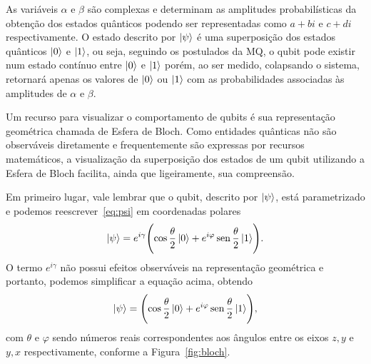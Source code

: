 As variáveis $\alpha$ e $\beta$ são complexas e determinam as amplitudes probabilísticas da obtenção dos estados quânticos podendo ser representadas como $a+bi$ e $c+di$ respectivamente. O estado descrito por $\ket{\psi}$ é uma superposição dos estados quânticos $\ket{0}$ e $\ket{1}$, ou seja, seguindo os postulados da MQ, o qubit pode existir num estado contínuo entre $\ket{0}$ e $\ket{1}$ porém, ao ser medido, colapsando o sistema, retornará apenas os valores de $\ket{0}$ ou $\ket{1}$ com as probabilidades associadas às amplitudes de $\alpha$ e $\beta$.

Um recurso para visualizar o comportamento de qubits é sua representação geométrica chamada de Esfera de Bloch. Como entidades quânticas não são observáveis diretamente e frequentemente são expressas por recursos matemáticos, a visualização da superposição dos estados de um qubit utilizando a Esfera de Bloch facilita, ainda que ligeiramente, sua compreensão.

Em primeiro lugar, vale lembrar que o qubit, descrito por $\ket{\psi}$, está parametrizado e podemos reescrever~\eqref{eq:psi} em coordenadas polares
\begin{equation}
\ket{\psi}=e^{i \gamma}\Biggl(\cos \frac{\theta}{2}\ket{0}+e^{i \varphi} \operatorname{sen} \frac{\theta}{2}\ket{1}\Biggr).
\end{equation}
O termo \(e^{i\gamma}\) não possui efeitos observáveis na representação geométrica e portanto, podemos simplificar a equação acima, obtendo
\begin{equation}\label{eq:coordpolarpsi}
\ket{\psi}=\Biggl(\cos \frac{\theta}{2}\ket{0}+e^{i \varphi} \operatorname{sen} \frac{\theta}{2}\ket{1}\Biggr),
\end{equation}
com $\theta$ e $\varphi$ sendo números reais correspondentes aos ângulos entre os eixos $z, y$ e $y, x$ respectivamente, conforme a
Figura~\ref{fig:bloch}.


